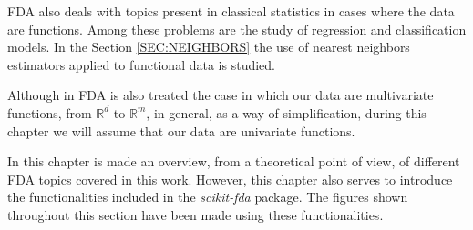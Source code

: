\acs{FDA} also deals with topics present in classical statistics in cases where the
data are functions. Among these problems are the study of regression and
classification models. In the Section \ref{SEC:NEIGHBORS} the use of nearest
neighbors estimators applied to functional data is studied.

Although in \acs{FDA} is also treated the case in which our data are multivariate
functions, from  $\mathbb{R}^d$ to $\mathbb{R}^m$, in general, as a way of
simplification, during this chapter we will assume that our data are
univariate functions.

In this chapter is made an overview, from a theoretical point of view, of
different \acs{FDA} topics covered in this work. However, this chapter also serves
to introduce the functionalities included in the \textit{scikit-fda} package.
The figures shown throughout this section have been made using these functionalities.
